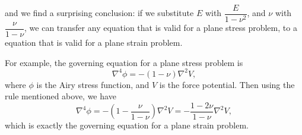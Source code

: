 \documentclass{article}
\begin{document}
and we find a surprising conclusion: if we substitute $E$ with $\dfrac{E}{1 - \nu^2}$, and $\nu$ with $\dfrac{\nu}{1 - \nu}$, we can transfer any equation that is valid for a plane stress problem, to a equation that is valid for a plane strain problem.

For example, the governing equation for a plane stress problem is
\[
\nabla^4 \phi = - (1 - \nu) \nabla^2 V, \tag*{(3.29)}
\]
where $\phi$ is the Airy stress function, and $V$ is the force potential. Then using the rule mentioned above, we have
\[
\nabla^4 \phi = - (1 - \frac{\nu}{1 - \nu}) \nabla^2 V = - \frac{1 - 2 \nu}{1 - \nu} \nabla^2 V, \tag*{(3.25)}
\]
which is exactly the governing equation for a plane strain problem.
\end{document}
